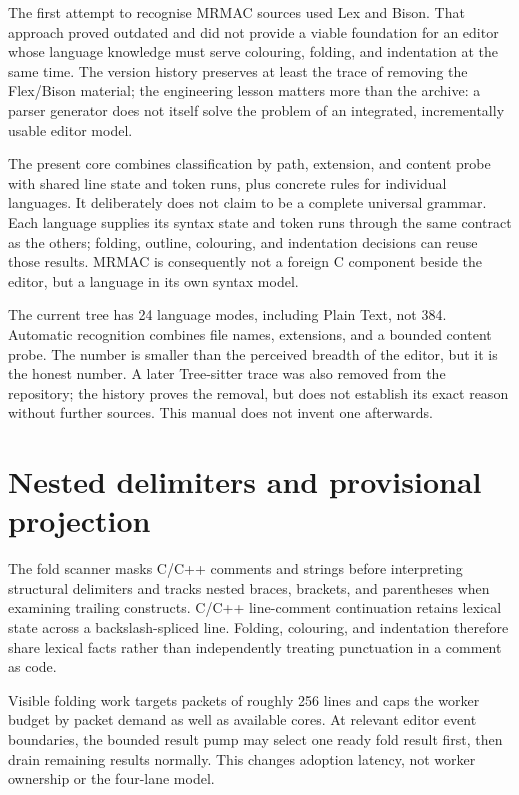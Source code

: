 \documentclass[a4paper,10pt,twoside,openany]{book}
\newcommand{\mrmac}{\textsc{MRMAC}}
\begin{document}
The first attempt to recognise \mrmac{} sources used Lex and Bison. That
approach proved outdated and did not provide a viable foundation for an editor
whose language knowledge must serve colouring, folding, and indentation at
the same time. The version history preserves at least the trace of removing
the Flex/Bison material; the engineering lesson matters more than the archive:
a parser generator does not itself solve the problem of an integrated,
incrementally usable editor model.

The present core combines classification by path, extension, and content probe
with shared line state and token runs, plus concrete rules for individual
languages. It deliberately does not claim to be a complete universal grammar.
Each language supplies its syntax state and token runs through the same
contract as the others; folding, outline, colouring, and indentation decisions
can reuse those results. \mrmac{} is consequently not a foreign C component
beside the editor, but a language in its own syntax model.

The current tree has 24 language modes, including Plain Text, not 384.
Automatic recognition combines file names, extensions, and a bounded content
probe. The number is smaller than the perceived breadth of the editor, but it
is the honest number. A later Tree-sitter trace was also removed from the
repository; the history proves the removal, but does not establish its exact
reason without further sources. This manual does not invent one afterwards.

\section{Nested delimiters and provisional projection}

The fold scanner masks C/C++ comments and strings before interpreting structural
delimiters and tracks nested braces, brackets, and parentheses when examining
trailing constructs. C/C++ line-comment continuation retains lexical state
across a backslash-spliced line. Folding, colouring, and indentation therefore
share lexical facts rather than independently treating punctuation in a
comment as code.

Visible folding work targets packets of roughly 256 lines and caps the worker
budget by packet demand as well as available cores. At relevant editor event
boundaries, the bounded result pump may select one ready fold result first,
then drain remaining results normally. This changes adoption latency, not
worker ownership or the four-lane model.
\end{document}

